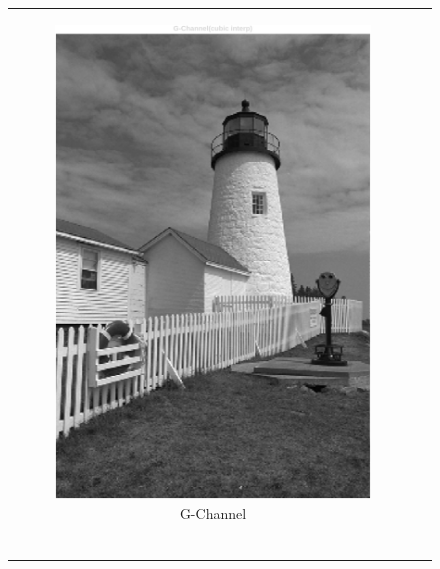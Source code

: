 \documentclass[11pt, a4]{article}
\begin{document}
\begin{enumerate}
\begin{enumerate}
\begin{figure}[h]
{\begin{tabular}{cc}
\begin{subfigure}[h]{0.45\linewidth}
						\includegraphics[width=\linewidth]{../output/2_G-channel_cubic.pdf}
						\caption{G-Channel}
						\label{fig:problem_part21_G_cubic}
					\end{subfigure}\\
					\begin{subfigure}[h]{0.45\linewidth}
						\centering

\end{subfigure}
\end{tabular}}
\end{figure}
\end{enumerate}
\end{enumerate}
\end{document}
